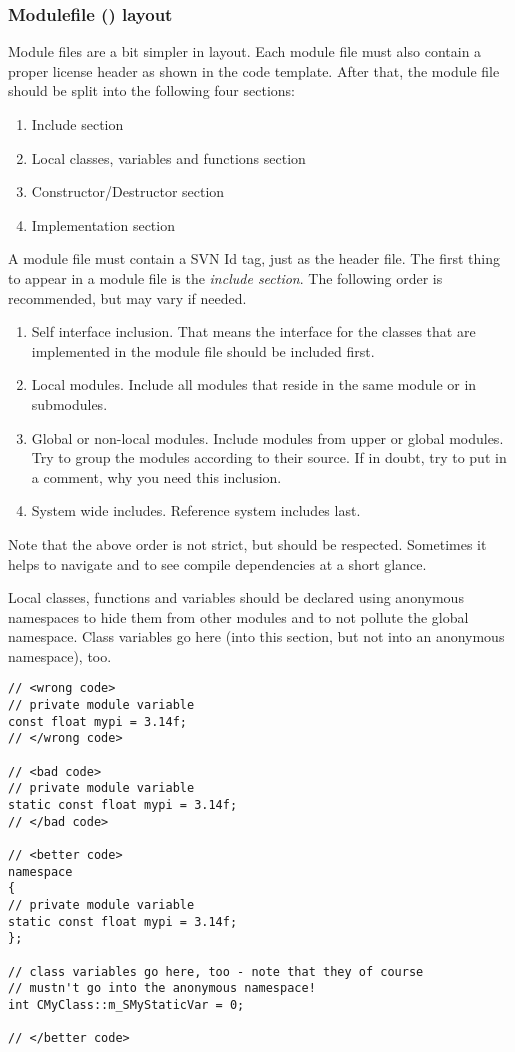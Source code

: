 

\subsubsection{Modulefile () layout}
Module files are a bit simpler in layout.
Each module file must also contain a proper license header as shown in the code template.
After that, the module file should be split into the following four sections:
\begin{enumerate}
\item Include section
\item Local classes, variables and functions section
\item Constructor/Destructor section
\item Implementation section
\end{enumerate}

A module file must contain a SVN Id tag, just as the header file.
The first thing to appear in a module file is the \emph{include section}.
The following order is recommended, but may vary if needed.
\begin{enumerate}
\item Self interface inclusion. 
That means the interface for the classes that are implemented in the module file should be included first.
\item Local modules. 
Include all modules that reside in the same module or in submodules.
\item Global or non-local modules.
Include modules from upper or global modules. 
Try to group the modules according to their source.
If in doubt, try to put in a comment, why you need this inclusion.
\item System wide includes.
Reference system includes last.
\end{enumerate}
Note that the above order is not strict, but should be respected.
Sometimes it helps to navigate and to see compile dependencies at a short glance.

Local classes, functions and variables should be declared using anonymous namespaces to hide them from other modules and to not pollute the global namespace.
Class variables go here (into this section, but not into an anonymous namespace), too.

\begin{verbatim}
// <wrong code>
// private module variable
const float mypi = 3.14f;
// </wrong code>

// <bad code>
// private module variable
static const float mypi = 3.14f;
// </bad code>

// <better code>
namespace
{
// private module variable
static const float mypi = 3.14f;
};

// class variables go here, too - note that they of course
// mustn't go into the anonymous namespace!
int CMyClass::m_SMyStaticVar = 0;

// </better code>
\end{verbatim}



